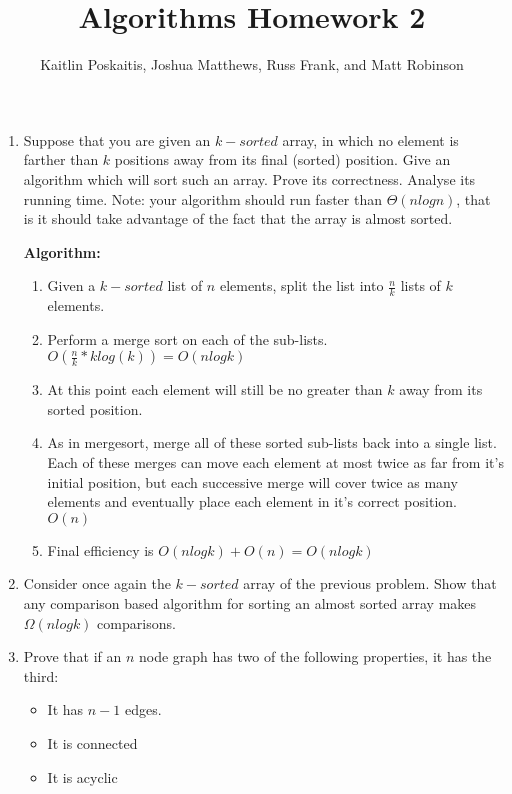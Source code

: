 \documentclass[12pt]{article}
\title{\bf Algorithms Homework 2}
\author{Kaitlin Poskaitis, Joshua Matthews, Russ Frank, and Matt Robinson}
\date{}
\begin{document}
\maketitle

\begin{enumerate}
\item Suppose that you are given an $k-sorted$ array, in which no element is
    farther than $k$ positions away from its final (sorted) position. Give an
    algorithm which will sort such an array. Prove its correctness. Analyse its
    running time. Note: your algorithm should run faster than $\Theta(nlogn)$,
    that is it should take advantage of the fact that the array is almost
    sorted.


\textbf{Algorithm:}

\begin{enumerate}
    \item Given a $k-sorted$ list of $n$ elements, split the list into
        $\frac{n}{k}$ lists of $k$ elements.

    \item Perform a merge sort on each of the sub-lists. \hfill $O(\frac{n}{k} *
        klog(k)) = O(nlogk)$

    \item At this point each element will still be no greater than $k$ away from
        its sorted position.

    \item As in mergesort, merge all of these sorted sub-lists back into a
        single list. Each of these merges can move each element at most twice as
        far from it's initial position, but each successive merge will cover
        twice as many elements and eventually place each element in it's correct
        position. \hfill $O(n)$

    \item Final efficiency is $O(nlogk) + O(n) = O(nlogk)$


\end{enumerate}


\item Consider once again the $k-sorted$ array of the previous problem. Show
    that any comparison based algorithm for sorting an almost sorted array makes
    $\Omega(nlogk)$ comparisons.

\item Prove that if an $n$ node graph has two of the following properties, it has the
third:
\begin{itemize}
    \item It has $n-1$ edges.
    \item It is connected
    \item It is acyclic
\end{itemize}


\end{enumerate}
\end{document}
